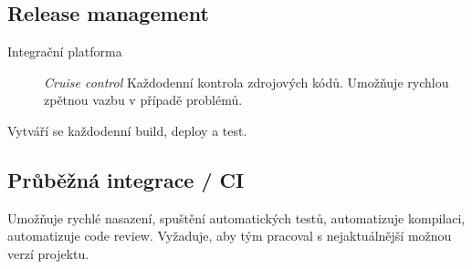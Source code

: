   \subsection{Release management}
    \begin{description}
      \item[Integrační platforma] \emph{Cruise control} Každodenní kontrola zdrojových kódů. Umožňuje
      rychlou zpětnou vazbu v případě problémů.
    \end{description}
    Vytváří se každodenní build, deploy a test.

  \subsection{Průběžná integrace / CI}
    Umožňuje rychlé nasazení, spuštění automatických testů, automatizuje kompilaci, automatizuje code review.
    Vyžaduje, aby tým pracoval s nejaktuálnější možnou verzí projektu.
